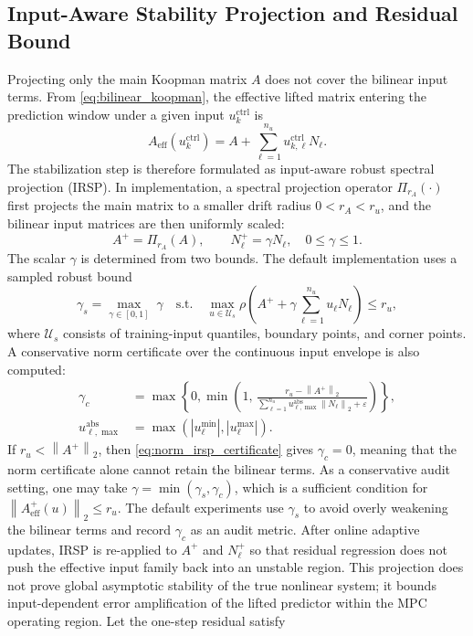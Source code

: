 \documentclass[twocolumn,3p,times,procedia]{elsarticle}
\newcommand{\norm}[1]{\left\lVert #1 \right\rVert}
\begin{document}
\subsection{Input-Aware Stability Projection and Residual Bound}

Projecting only the main Koopman matrix $A$ does not cover the bilinear input terms. From \eqref{eq:bilinear_koopman}, the effective lifted matrix entering the prediction window under a given input $u_k^{\mathrm{ctrl}}$ is
\begin{equation}
A_{\mathrm{eff}}(u_k^{\mathrm{ctrl}})=A+\sum_{\ell=1}^{n_u}u_{k,\ell}^{\mathrm{ctrl}}N_\ell .
\label{eq:effective_bilinear_matrix}
\end{equation}
The stabilization step is therefore formulated as input-aware robust spectral projection (IRSP). In implementation, a spectral projection operator $\Pi_{r_A}(\cdot)$ first projects the main matrix to a smaller drift radius $0<r_A<r_u$, and the bilinear input matrices are then uniformly scaled:
\begin{equation}
A^+=\Pi_{r_A}(A),\qquad N_\ell^+=\gamma N_\ell,\quad 0\le\gamma\le 1 .
\label{eq:irsp_projection}
\end{equation}
The scalar $\gamma$ is determined from two bounds. The default implementation uses a sampled robust bound
\begin{equation}
\gamma_s=\max_{\gamma\in[0,1]}\;\gamma
\quad \mathrm{s.t.}\quad
\max_{u\in\mathcal U_s}
\rho\!\left(A^++\gamma\sum_{\ell=1}^{n_u}u_\ell N_\ell\right)
\le r_u ,
\label{eq:sampled_irsp}
\end{equation}
where $\mathcal U_s$ consists of training-input quantiles, boundary points, and corner points. A conservative norm certificate over the continuous input envelope is also computed:
\begin{equation}
\begin{aligned}
\gamma_c&=\max\left\{0,\min\left(1,\,
\frac{r_u-\norm{A^+}_2}{\sum_{\ell=1}^{n_u}u_{\ell,\max}^{\mathrm{abs}}\norm{N_\ell}_2+\varepsilon}
\right)\right\},\\
u_{\ell,\max}^{\mathrm{abs}}&=\max(|u_\ell^{\min}|,|u_\ell^{\max}|).
\end{aligned}
\label{eq:norm_irsp_certificate}
\end{equation}
If $r_u<\norm{A^+}_2$, then \eqref{eq:norm_irsp_certificate} gives $\gamma_c=0$, meaning that the norm certificate alone cannot retain the bilinear terms. As a conservative audit setting, one may take $\gamma=\min(\gamma_s,\gamma_c)$, which is a sufficient condition for $\norm{A_{\mathrm{eff}}^+(u)}_2\le r_u$. The default experiments use $\gamma_s$ to avoid overly weakening the bilinear terms and record $\gamma_c$ as an audit metric. After online adaptive updates, IRSP is re-applied to $A^+$ and $N_\ell^+$ so that residual regression does not push the effective input family back into an unstable region. This projection does not prove global asymptotic stability of the true nonlinear system; it bounds input-dependent error amplification of the lifted predictor within the MPC operating region. Let the one-step residual satisfy
\end{document}
